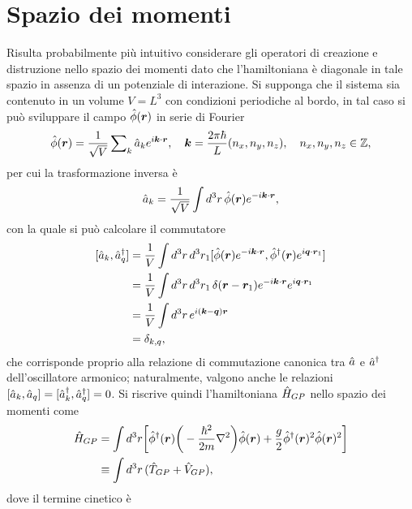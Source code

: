 \section{Spazio dei momenti}
Risulta probabilmente più intuitivo considerare gli operatori di creazione e distruzione nello spazio dei momenti dato che l'hamiltoniana è diagonale in tale spazio in assenza di un potenziale di interazione. Si supponga che il sistema sia contenuto in un volume $V = L^3$ con condizioni periodiche al bordo, in tal caso si può sviluppare il campo $\hat{\phi}(\bm{r})$ in serie di Fourier 
\begin{equation}
    \hat{\phi}(\bm{r}) = \frac{1}{\sqrt{V}}\sum\nolimits_k\hat{a}_ke^{i\bm{k}\cdot\bm{r}},\quad \bm{k} = \frac{2\pi\hbar}{L}(n_x,n_y,n_z),\quad n_x,n_y,n_z \in \mathbb{Z},
\end{equation}
per cui la trasformazione inversa è
\begin{equation}
    \hat{a}_k = \frac{1}{\sqrt{V}}\int d^3r\,\hat{\phi}(\bm{r})e^{-i\bm{k}\cdot\bm{r}},
\end{equation}
con la quale si può calcolare il commutatore
\begin{equation}
    \begin{split}
        [\hat{a}_k,\hat{a}^\dagger_q] &= \frac{1}{V}\int d^3r\,d^3r_1[\hat{\phi}(\bm{r})e^{-i\bm{k}\cdot\bm{r}},\hat{\phi}^\dagger(\bm{r})e^{i\bm{q}\cdot\bm{r}_1}] \\
        &= \frac{1}{V}\int d^3r\,d^3r_1\,\delta(\bm{r} - \bm{r}_1)e^{-i\bm{k}\cdot\bm{r}}e^{i\bm{q}\cdot\bm{r}_1} \\
        &= \frac{1}{V}\int d^3r\,e^{i(\bm{k} - \bm{q})\bm{r}} \\
        &= \delta_{k,q},
    \end{split}
\end{equation}
che corrisponde proprio alla relazione di commutazione canonica tra $\hat{a}$ e $\hat{a}^\dagger$ dell'oscillatore armonico; naturalmente, valgono anche le relazioni $[\hat{a}_k,\hat{a}_q] = [\hat{a}^\dagger_k,\hat{a}^\dagger_q] = 0$. Si riscrive quindi l'hamiltoniana $\hat{H}_{GP}$ nello spazio dei momenti come
\begin{equation}
    \begin{split}
        \hat{H}_{GP} &= \int d^3r\bigg[\hat{\phi}^\dagger(\bm{r})\bigg(-\frac{\hbar^2}{2m}\nabla^2\bigg)\hat{\phi}(\bm{r}) + \frac{g}{2}\hat{\phi}^\dagger(\bm{r})^2\hat{\phi}(\bm{r})^2\bigg] \\
        &\equiv \int d^3r\,(\hat{T}_{GP} + \hat{V}_{GP}),
    \end{split}
\end{equation}
dove il termine cinetico è
